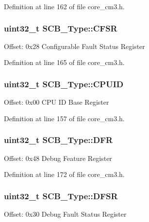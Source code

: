 Definition at line 162 of file core\+\_\+cm3.\+h.

\subsubsection[{\texorpdfstring{C\+F\+SR}{CFSR}}]{ {\bf uint32\+\_\+t} S\+C\+B\+\_\+\+Type\+::\+C\+F\+SR}\hypertarget{struct_s_c_b___type_a2f94bf549b16fdeb172352e22309e3c4}{}\label{struct_s_c_b___type_a2f94bf549b16fdeb172352e22309e3c4}
Offset\+: 0x28 Configurable Fault Status Register 

Definition at line 165 of file core\+\_\+cm3.\+h.

\subsubsection[{\texorpdfstring{C\+P\+U\+ID}{CPUID}}]{ {\bf uint32\+\_\+t} S\+C\+B\+\_\+\+Type\+::\+C\+P\+U\+ID}\hypertarget{struct_s_c_b___type_afa7a9ee34dfa1da0b60b4525da285032}{}\label{struct_s_c_b___type_afa7a9ee34dfa1da0b60b4525da285032}
Offset\+: 0x00 C\+PU ID Base Register 

Definition at line 157 of file core\+\_\+cm3.\+h.

\subsubsection[{\texorpdfstring{D\+FR}{DFR}}]{ {\bf uint32\+\_\+t} S\+C\+B\+\_\+\+Type\+::\+D\+FR}\hypertarget{struct_s_c_b___type_a586a5225467262b378c0f231ccc77f86}{}\label{struct_s_c_b___type_a586a5225467262b378c0f231ccc77f86}
Offset\+: 0x48 Debug Feature Register 

Definition at line 172 of file core\+\_\+cm3.\+h.

\subsubsection[{\texorpdfstring{D\+F\+SR}{DFSR}}]{ {\bf uint32\+\_\+t} S\+C\+B\+\_\+\+Type\+::\+D\+F\+SR}\hypertarget{struct_s_c_b___type_ad7d61d9525fa9162579c3da0b87bff8d}{}\label{struct_s_c_b___type_ad7d61d9525fa9162579c3da0b87bff8d}
Offset\+: 0x30 Debug Fault Status Register 

